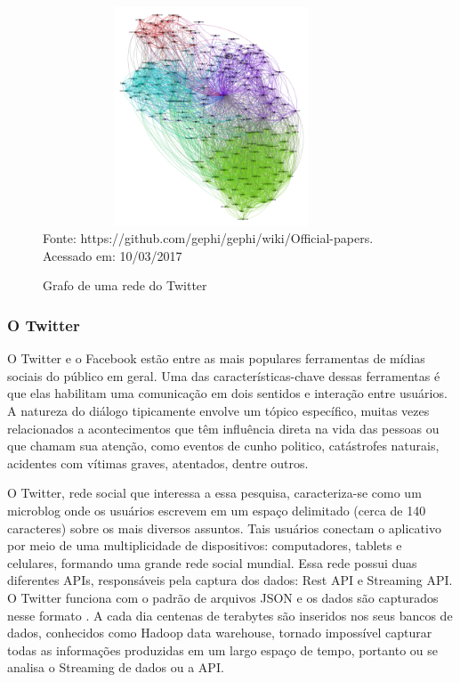 \begin{figure}[!ht]
	\centering
	\caption{Grafo de uma rede do Twitter}
	\vspace{1mm}
	\includegraphics[width=100mm, height=65mm]{Figuras/BigData/grafoExemplo.png}\\
	\tiny Fonte: https://github.com/gephi/gephi/wiki/Official-papers. Acessado em: 10/03/2017
\end{figure}



\subsubsection{O Twitter}

O Twitter e o Facebook estão entre as mais populares ferramentas de mídias sociais do público em geral. Uma das características-chave
dessas ferramentas é que elas habilitam uma comunicação em dois sentidos e interação entre usuários. A natureza do diálogo tipicamente envolve um tópico específico, muitas vezes relacionados a acontecimentos que têm influência direta na vida das pessoas ou que chamam sua atenção, como eventos de cunho politico, catástrofes naturais, acidentes com vítimas graves, atentados, dentre outros.

O Twitter, rede social que interessa a essa pesquisa, caracteriza-se como um microblog onde os usuários escrevem em um espaço delimitado (cerca de 140 caracteres) sobre os mais diversos assuntos. Tais usuários conectam o aplicativo por meio de uma multiplicidade de dispositivos: computadores, tablets e celulares, formando uma grande rede social mundial. Essa rede possui duas diferentes APIs, responsáveis pela captura dos dados: Rest API e Streaming API. O Twitter funciona com o padrão de arquivos JSON e os dados são capturados nesse formato \cite{francca14big}. A cada dia centenas de terabytes são inseridos nos seus bancos de dados, conhecidos como Hadoop data warehouse, tornado impossível capturar todas as informações produzidas em um largo espaço de tempo, portanto ou se analisa o Streaming de dados ou a API.

